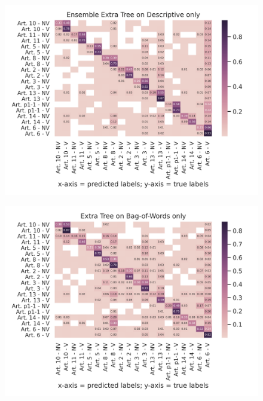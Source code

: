 \documentclass{article}
\begin{document}
\begin{figure}[!htb]
    \centering
    \includegraphics[scale=0.7]{data/analysis/cm/multiclass_cm_test_ensemble_extra_tree_descriptive_only.png}  
\end{figure}
\begin{figure}[!htb]
    \centering
    \includegraphics[scale=0.7]{data/analysis/cm/multiclass_cm_test_extra_tree_bag-of-words_only.png}  
\end{figure}
\end{document}
